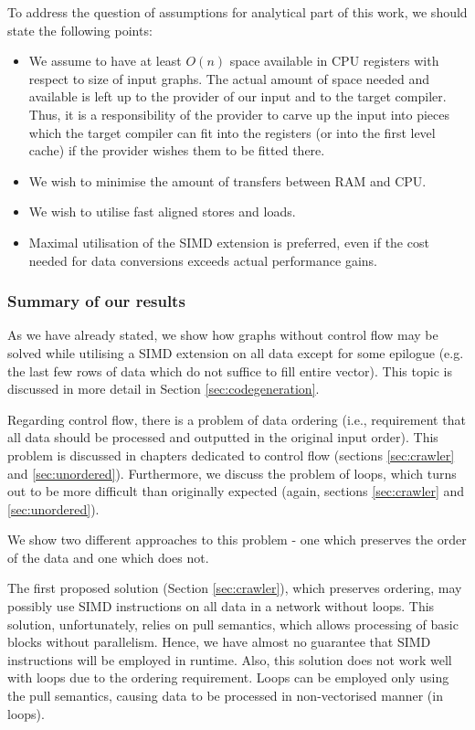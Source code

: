 To address the question of assumptions for analytical part of this work, we should state the following points:
\begin{itemize}
  \item We assume to have at least $O(n)$ space available in CPU registers with respect to size of input graphs. The actual amount of space needed and available is left up to the provider of our input and to the target compiler. Thus, it is a responsibility of the provider to carve up the input into pieces which the target compiler can fit into the registers (or into the first level cache) if the provider wishes them to be fitted there.
  \item We wish to minimise the amount of transfers between RAM and CPU.
  \item We wish to utilise fast aligned stores and loads.
  \item Maximal utilisation of the SIMD extension is preferred, even if the cost needed for data conversions exceeds actual performance gains.
\end{itemize}

\subsubsection{Summary of our results}

  As we have already stated, we show how graphs without control flow may be solved while utilising a SIMD extension on all data except for some epilogue (e.g. the last few rows of data which do not suffice to fill entire vector). This topic is discussed in more detail in Section \ref{sec:codegeneration}.


  Regarding control flow, there is a problem of data ordering (i.e., requirement that all data should be processed and outputted in the original input order). This problem is discussed in chapters dedicated to control flow (sections \ref{sec:crawler} and \ref{sec:unordered}).  Furthermore, we discuss the problem of loops, which turns out to be more difficult than originally expected (again, sections \ref{sec:crawler} and \ref{sec:unordered}).


We show two different approaches to this problem - one which preserves the order of the data and one which does not. 


  The first proposed solution (Section \ref{sec:crawler}), which preserves ordering, may possibly use SIMD instructions on all data in a network without loops. This solution, unfortunately, relies on pull semantics, which allows processing of basic blocks without parallelism. Hence, we have almost no guarantee that SIMD instructions will be employed in runtime. Also, this solution does not work well with loops due to the ordering requirement. Loops can be employed only using the pull semantics, causing data to be processed in non-vectorised manner (in loops).


